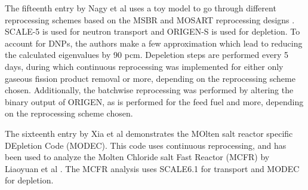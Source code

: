 The fifteenth entry by Nagy et al uses a toy model to go through different reprocessing schemes based on the MSBR and MOSART reprocessing designs \cite{robertson_conceptual_1971, ignatiev_progress_2007}. SCALE-5 \cite{noauthor_scale_2005} is used for neutron transport and ORIGEN-S is used for depletion. To account for DNPs, the authors make a few approximation which lead to reducing the calculated eigenvalues by 90 pcm. Depeletion steps are performed every 5 days, during which continuous reprocessing was implemented for either only gaseous fission product removal or more, depending on the reprocessing scheme chosen. Additionally, the batchwise reprocessing was performed by altering the binary output of ORIGEN, as is performed for the feed fuel and more, depending on the reprocessing scheme chosen.

The sixteenth entry by Xia et al demonstrates the MOlten salt reactor specific DEpletion Code (MODEC). This code uses continuous reprocessing, and has been used to analyze the Molten Chloride salt Fast Reactor (MCFR) by Liaoyuan et al \cite{liaoyuan_th-u_2021}. The MCFR analysis uses SCALE6.1 for transport and MODEC for depletion. 



